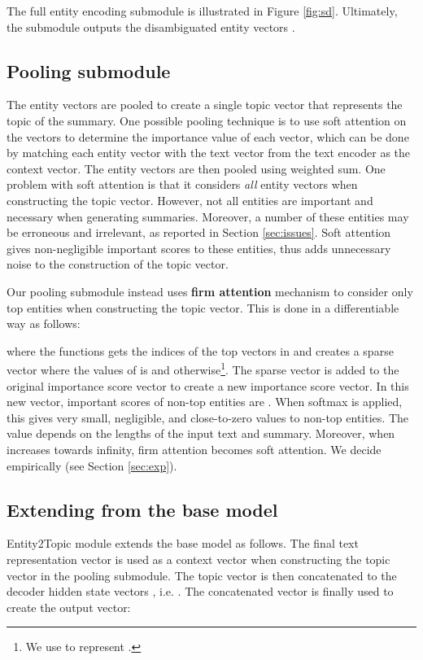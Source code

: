 \documentclass[11pt,a4paper]{article}
\begin{document}
The full entity encoding submodule is illustrated in Figure \ref{fig:sd}. Ultimately, the submodule outputs the disambiguated entity vectors .

\subsection{Pooling submodule}

The entity vectors  are pooled to create a single topic vector  that represents the topic of the summary. One possible 
pooling technique 
is to use soft attention \cite{xu2015show} on the vectors to determine the importance value of each vector, which can be done by matching each entity vector with the text vector  from the text encoder as the context vector. The entity vectors are then pooled using weighted sum.
One problem with soft attention is that it considers \textit{all} entity vectors when constructing the topic vector. However, not all entities are important and necessary when generating summaries. Moreover, a number of these entities may be erroneous and irrelevant, as reported in Section \ref{sec:issues}. Soft attention gives non-negligible important scores to these entities, thus adds unnecessary noise to the construction of the topic vector.

Our pooling submodule instead uses \textbf{firm attention} mechanism to consider only top  entities when constructing the topic vector. This is done in a differentiable way as follows:

where the functions  gets the indices of the top  vectors in  and  creates a sparse vector where the values of  is  and  otherwise\footnote{We use  to represent .}. The sparse vector  is added to the original importance score vector  to create a new importance score vector. In this new vector, important scores of non-top  entities are .
When softmax is applied, this gives very small, negligible, and close-to-zero values to non-top  entities.
The value  depends on the lengths of the input text and summary.
Moreover, when  increases towards infinity, firm attention becomes soft attention.
We decide  empirically (see Section \ref{sec:exp}).

\subsection{Extending from the base model}

Entity2Topic module extends the base model as follows. The final text representation vector  is used as a context vector when constructing the topic vector  in the pooling submodule. The topic vector  is then concatenated to the decoder hidden state vectors , i.e. . The concatenated vector is finally used to create the output vector:
\end{document}
